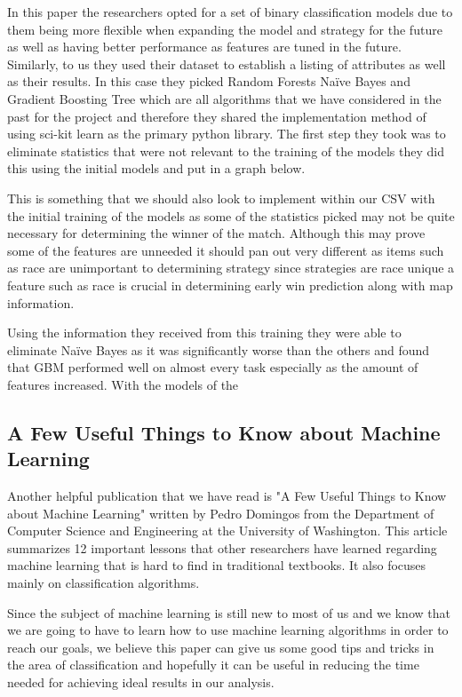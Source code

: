 \documentclass[a4paper,12pt]{report}
\begin{document}
In this paper the researchers opted for a set of binary classification models due to them being more flexible when expanding the model and strategy for the future as well as having better performance as features are tuned in the future. Similarly, to us they used their dataset to establish a listing of attributes as well as their results. In this case they picked Random Forests Naïve Bayes and Gradient Boosting Tree which are all algorithms that we have considered in the past for the project and therefore they shared the implementation method of using sci-kit learn as the primary python library. The first step they took was to eliminate statistics that were not relevant to the training of the models they did this using the initial models and put in a graph below.

This is something that we should also look to implement within our CSV with the initial training of the models as some of the statistics picked may not be quite necessary for determining the winner of the match. Although this may prove some of the features are unneeded it should pan out very different as items such as race are unimportant to determining strategy since strategies are race unique a feature such as race is crucial in determining early win prediction along with map information.

Using the information they received from this training they were able to eliminate Naïve Bayes as it was significantly worse than the others and found that GBM performed well on almost every task especially as the amount of features increased. With the models of the

\subsection{A Few Useful Things to Know about Machine Learning}

Another helpful publication that we have read is "A Few Useful Things to Know about Machine Learning" written by Pedro Domingos from the Department of Computer Science and Engineering at the University of Washington. This article summarizes 12 important lessons that other researchers have learned regarding machine learning that is hard to find in traditional textbooks. It also focuses mainly on classification algorithms. 

Since the subject of machine learning is still new to most of us and we know that we are going to have to learn how to use machine learning algorithms in order to reach our goals, we believe this paper can give us some good tips and tricks in the area of classification and hopefully it can be useful in reducing the time needed for achieving ideal results in our analysis.
\end{document}

